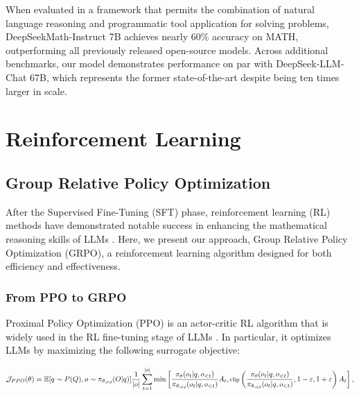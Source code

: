 \begin{itemize}[topsep=0pt]
\begin{itemize}[topsep=0pt]
When evaluated in a framework that permits the combination of natural language reasoning and programmatic tool application for solving problems, DeepSeekMath-Instruct 7B achieves nearly 60\% accuracy on MATH, outperforming all previously released open-source models. Across additional benchmarks, our model demonstrates performance on par with DeepSeek-LLM-Chat 67B, which represents the former state-of-the-art despite being ten times larger in scale.
\section{Reinforcement Learning}

\subsection{Group Relative Policy Optimization} After the Supervised Fine-Tuning (SFT) phase, reinforcement learning (RL) methods have demonstrated notable success in enhancing the mathematical reasoning skills of LLMs \citep{wang2023math,wizardmath}. Here, we present our approach, Group Relative Policy Optimization (GRPO), a reinforcement learning algorithm designed for both efficiency and effectiveness.

\subsubsection{From PPO to GRPO} Proximal Policy Optimization (PPO) \citep{schulman2017proximal} is an actor-critic RL algorithm that is widely used in the RL fine-tuning stage of LLMs \citep{ouyang2022training}. In particular, it optimizes LLMs by maximizing the following surrogate objective:

\begin{equation}
\footnotesize
    \mathcal{J}_{PPO}(\theta) = \mathbb{E}{[q \sim P(Q), o \sim \pi_{\theta_{old}}(O|q)]} \frac{1}{|o|} \sum_{t=1}^{|o|} \min \left[ \frac{\pi_\theta(o_{t} | q, o_{<t})}{\pi_{\theta_{old}}(o_{t} | q, o_{<t})} A_{t}, \text{clip} \left( \frac{\pi_\theta(o_{t} | q, o_{<t})}{\pi_{\theta_{old}}(o_{t} | q, o_{<t})}, 1 - \varepsilon, 1 + \varepsilon \right)  A_{t} \right] ,
\end{equation}


\end{itemize}
\end{itemize}

